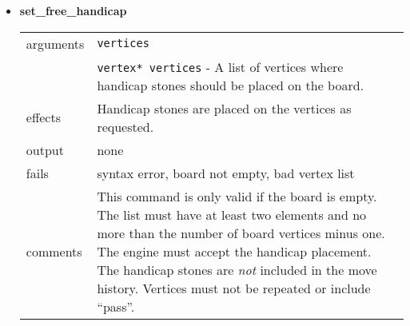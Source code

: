 \documentclass[a4paper]{article}
\begin{document}
\begin{itemize}
\item \textbf{set\_free\_handicap} \\
  \begin{tabularx}{\linewidth}{lX}
    arguments & \texttt{vertices} \\
    & \texttt{vertex* vertices} - A list of vertices where handicap
                stones should be placed on the board. \\
    effects &   Handicap stones are placed on the vertices as requested. \\
    output &    none \\
    fails &     syntax error, board not empty, bad vertex list \\
    comments &  This command is only valid if the board is empty.
                The list must have at least two elements and no more than
                the number of board vertices minus one.
                The engine must accept the handicap placement.
                The handicap stones are \emph{not} included in the move
                history. Vertices must not be repeated or include ``pass''.
  \end{tabularx}
\end{itemize}
\end{document}
